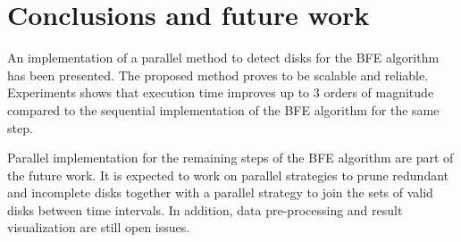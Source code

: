 \documentclass[12pt]{scrartcl}
\begin{document}
\section{Conclusions and future work}\label{sec:conclusions}

An implementation of a parallel method to detect disks for the BFE algorithm has been presented.  The proposed method proves to be scalable and reliable. Experiments shows that execution time improves up to 3 orders of magnitude compared to the sequential implementation of the BFE algorithm for the same step.

Parallel implementation for the remaining steps of the BFE algorithm are part of the future work. It is expected to work on parallel strategies to prune redundant and incomplete disks together with a parallel strategy to join the sets of valid disks between time intervals.  In addition, data pre-processing and result visualization are still open issues.



\end{document}
